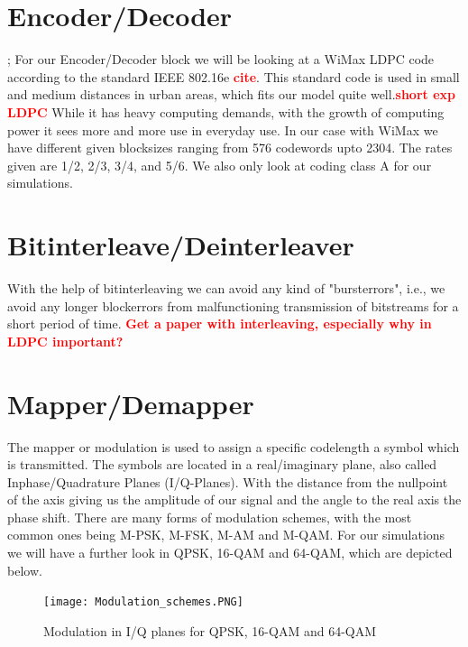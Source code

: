 \documentclass[12pt,oneside, reqno]{report}
\newcommand\boldred[1]{\textcolor{red}{\textbf{#1}}}
\begin{document}
\section{Encoder/Decoder}
\label{sec:code};
For our Encoder/Decoder block we will be looking at a WiMax \gls{LDPC} code according to the standard IEEE 802.16e \boldred{cite}. This standard code is used in small and medium distances in urban areas, which fits our model quite well.\boldred{short exp LDPC} While it has heavy computing demands, with the growth of computing power it sees more and more use in everyday use. In our case with WiMax we have different given blocksizes ranging from 576 codewords upto 2304. The rates given are 1/2, 2/3, 3/4, and 5/6. We also only look at coding class A for our simulations. 


\section{Bitinterleave/Deinterleaver}
\label{sec:BIC}
With the help of bitinterleaving we can avoid any kind of "bursterrors", i.e., we avoid any longer blockerrors from malfunctioning transmission of bitstreams for a short period of time. \boldred{Get a paper with interleaving, especially why in LDPC important?}
\newpage

\section{Mapper/Demapper}
\label{sec:mod}

The mapper or modulation is used to assign a specific codelength a symbol which is transmitted. The symbols are located in a real/imaginary plane, also called Inphase/Quadrature Planes (I/Q-Planes). With the distance from the nullpoint of the axis giving us the amplitude of our signal and the angle to the real axis the phase shift. 
There are many forms of modulation schemes, with the most common ones being M-PSK, M-FSK, M-AM and M-QAM. For our simulations we will have a further look in \gls{QPSK}, 16-QAM and 64-QAM, which are depicted below.

\begin{figure}[H]
	\centering
	\texttt{[image: Modulation\_schemes.PNG]}
	\caption{Modulation in I/Q planes for QPSK, 16-QAM and 64-QAM}
	\label{fig:Modulation}
\end{figure}
\end{document}
